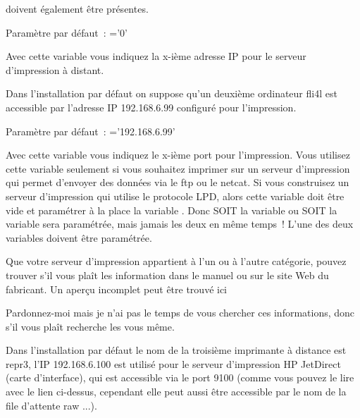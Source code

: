 \begin{description}
    doivent également être présentes.

    Paramètre par défaut~: ='0'



    Avec cette variable  vous indiquez la x-ième
    adresse IP pour le serveur d'impression à distant.

    Dans l'installation par défaut on suppose qu'un deuxième ordinateur fli4l
    est accessible par l'adresse IP 192.168.6.99 configuré pour l'impression.

    Paramètre par défaut~: ='192.168.6.99'



    Avec cette variable  vous indiquez le x-ième
    port pour l'impression.
    Vous utilisez cette variable seulement si vous souhaitez imprimer sur
    un serveur d'impression qui permet d'envoyer des données via le ftp ou le netcat.
    Si vous construisez un serveur d'impression qui utilise le protocole LPD, alors
    cette variable doit être vide et paramétrer à la place la variable
    . Donc
    SOIT la variable  ou SOIT la variable
     sera
    paramétrée, mais jamais les deux en même temps~! L'une des deux variables
    doivent être paramétrée.

    Que votre serveur d'impression appartient à l'un ou à l'autre catégorie,
    pouvez trouver s'il vous plaît les information dans le manuel ou sur le site
    Web du fabricant. Un aperçu incomplet peut être trouvé ici


    Pardonnez-moi mais je n'ai pas le temps de vous chercher ces informations,
    donc s'il vous plaît recherche les vous même.

    Dans l'installation par défaut le nom de la troisième imprimante à distance
    est repr3, l'IP 192.168.6.100 est utilisé pour le serveur d'impression HP
    JetDirect (carte d'interface), qui est accessible via le port 9100 (comme
    vous pouvez le lire avec le lien ci-dessus, cependant elle peut aussi être
    accessible par le nom de la file d'attente raw ...).


\end{description}
